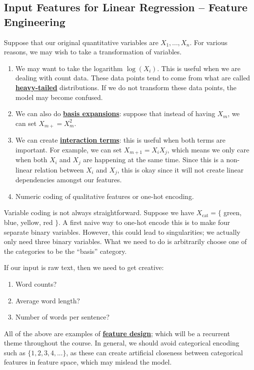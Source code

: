 \documentclass[11pt]{scrartcl}
\theoremstyle{definition}
\theoremstyle{remark}
\newcommand{\dfn}[1]{\textbf{\underline{#1}}}
\begin{document}
\subsection{Input Features for Linear Regression -- Feature Engineering}
Suppose that our original quantitative variables are $X_1, ..., X_n$. For various reasons, we may wish to take a transformation of variables. 
\begin{enumerate}[noitemsep]
	\item We may want to take the logarithm $\log(X_i)$. This is useful when we are dealing with count data. These data points tend to come from what are called \dfn{heavy-tailed} distributions. If we do not transform these data points, the model may become confused. 
	\item We can also do \dfn{basis expansions}: suppose that instead of having $X_m$, we can set $X_{m+} = X_m^2$. 
	\item We can create \dfn{interaction terms}: this is useful when both terms are important. For example, we can set $X_{m+1} = X_i X_j$, which means we only care when both $X_i$ and $X_j$ are happening at the same time. Since this is a non-linear relation between $X_i$ and $X_j$, this is okay since it will not create linear dependencies amongst our features. 
	\item Numeric coding of qualitative features or one-hot encoding. 
\end{enumerate}
Variable coding is not always straightforward. Suppose we have $X_{\text{cat}} = \{$ green, blue, yellow, red $\}$. A first naive way to one-hot encode this is to make four separate binary variables. However, this could lead to singularities; we actually only need three binary variables. What we need to do is arbitrarily choose one of the categories to be the ``basis'' category. 

If our input is raw text, then we need to get creative:
\begin{enumerate}[noitemsep]
	\item Word counts? 
	\item Average word length?
	\item Number of words per sentence? 
\end{enumerate}
All of the above are examples of \dfn{feature design}; which will be a recurrent theme throughout the course. In general, we should avoid categorical encoding such as $\{ 1, 2, 3, 4, ... \}$, as these can create artificial closeness between categorical features in feature space, which may mislead the model. 
\end{document}
